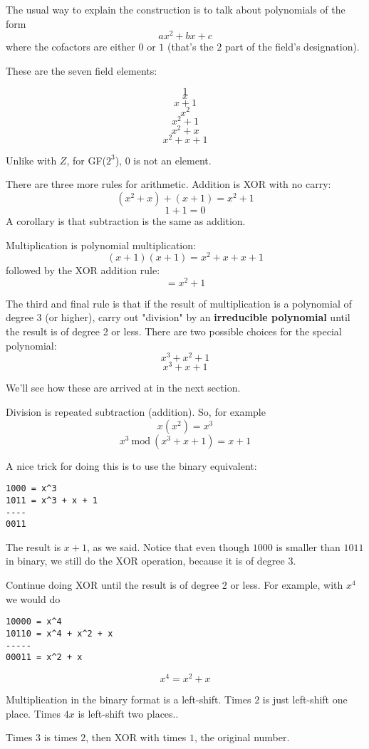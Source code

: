 \documentclass[11pt, oneside]{article}
\begin{document}
The usual way to explain the construction is to talk about polynomials of the form
\[ ax^2 + bx + c \]
where the cofactors are either $0$ or $1$ (that's the $2$ part of the field's designation).  

These are the seven field elements:

\[ 1 \]
\[ x \]
\[ x + 1 \]
\[ x^2 \]
\[ x^2 + 1 \]
\[ x^2 + x \]
\[ x^2 + x + 1 \]

Unlike with $Z$, for GF($2^3$), $0$ is not an element.

There are three more rules for arithmetic.  Addition is XOR with no carry:
\[ (x^2 + x) + (x + 1) = x^2 + 1 \]
\[ 1 + 1 = 0 \]
A corollary is that subtraction is the same as addition.

Multiplication is polynomial multiplication:
\[ (x + 1)(x + 1) = x^2 + x + x + 1 \]
followed by the XOR addition rule:
\[ = x^2 + 1 \]

The third and final rule is that if the result of multiplication is a polynomial of degree 3 (or higher), carry out "division" by an \textbf{irreducible polynomial} until the result is of degree 2 or less.  There are two possible choices for the special polynomial:
\[ x^3 + x^2 + 1 \]
\[ x^3 + x + 1 \]

We'll see how these are arrived at in the next section.  

Division is repeated subtraction (addition).  So, for example
\[ x (x^2) = x^3 \]
\[ x^3 \ \text{mod}\  (x^3 + x + 1) = x + 1 \]

A nice trick for doing this is to use the binary equivalent:
\begin{verbatim}
1000 = x^3
1011 = x^3 + x + 1
----
0011
\end{verbatim}

The result is $x + 1$, as we said.  Notice that even though $1000$ is smaller than $1011$ in binary, we still do the XOR operation, because it is of degree 3.

Continue doing XOR until the result is of degree 2 or less.  For example, with $x^4$ we would do

\begin{verbatim}
10000 = x^4
10110 = x^4 + x^2 + x
-----
00011 = x^2 + x
\end{verbatim}

\[ x^4 = x^2 + x \]

Multiplication in the binary format is a left-shift.  Times $2$ is just left-shift one place.  Times $4x$ is left-shift two places..  

Times $3$ is times $2$, then XOR with times $1$, the original number.
\end{document}
